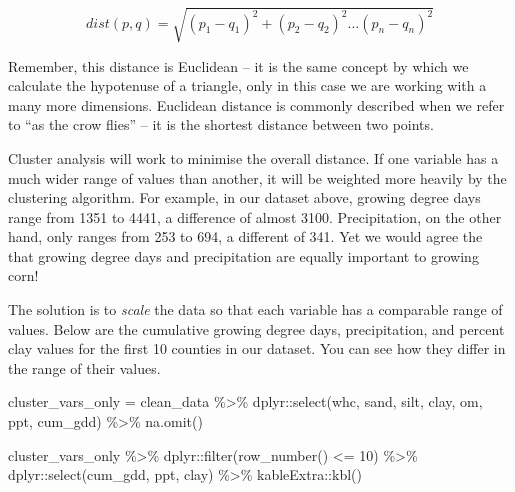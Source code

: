 \documentclass[
]{book}
\newenvironment{Shaded}{\begin{snugshade}}{\end{snugshade}}
\newcommand{\DecValTok}[1]{\textcolor[rgb]{0.00,0.00,0.81}{#1}}
\newcommand{\FunctionTok}[1]{\textcolor[rgb]{0.00,0.00,0.00}{#1}}
\newcommand{\NormalTok}[1]{#1}
\newcommand{\OtherTok}[1]{\textcolor[rgb]{0.56,0.35,0.01}{#1}}
\newcommand{\SpecialCharTok}[1]{\textcolor[rgb]{0.00,0.00,0.00}{#1}}
\begin{document}
\[dist(p,q) = \sqrt{(p_1 - q_1)^2 + (p_2 - q_2)^2 ... (p_n - q_n)^2} \]

Remember, this distance is Euclidean -- it is the same concept by which we calculate the hypotenuse of a triangle, only in this case we are working with a many more dimensions. Euclidean distance is commonly described when we refer to ``as the crow flies'' -- it is the shortest distance between two points.

Cluster analysis will work to minimise the overall distance. If one variable has a much wider range of values than another, it will be weighted more heavily by the clustering algorithm. For example, in our dataset above, growing degree days range from 1351 to 4441, a difference of almost 3100. Precipitation, on the other hand, only ranges from 253 to 694, a different of 341. Yet we would agree the that growing degree days and precipitation are equally important to growing corn!

The solution is to \emph{scale} the data so that each variable has a comparable range of values. Below are the cumulative growing degree days, precipitation, and percent clay values for the first 10 counties in our dataset. You can see how they differ in the range of their values.

\begin{Shaded}
\begin{Highlighting}[]
\NormalTok{cluster\_vars\_only }\OtherTok{=}\NormalTok{ clean\_data }\SpecialCharTok{\%\textgreater{}\%}
\NormalTok{  dplyr}\SpecialCharTok{::}\FunctionTok{select}\NormalTok{(whc, sand, silt, clay, om, ppt, cum\_gdd) }\SpecialCharTok{\%\textgreater{}\%}
  \FunctionTok{na.omit}\NormalTok{()}

\NormalTok{cluster\_vars\_only }\SpecialCharTok{\%\textgreater{}\%}
\NormalTok{  dplyr}\SpecialCharTok{::}\FunctionTok{filter}\NormalTok{(}\FunctionTok{row\_number}\NormalTok{() }\SpecialCharTok{\textless{}=} \DecValTok{10}\NormalTok{) }\SpecialCharTok{\%\textgreater{}\%}
\NormalTok{  dplyr}\SpecialCharTok{::}\FunctionTok{select}\NormalTok{(cum\_gdd, ppt, clay) }\SpecialCharTok{\%\textgreater{}\%}
\NormalTok{  kableExtra}\SpecialCharTok{::}\FunctionTok{kbl}\NormalTok{()}
\end{Highlighting}
\end{Shaded}
\end{document}
